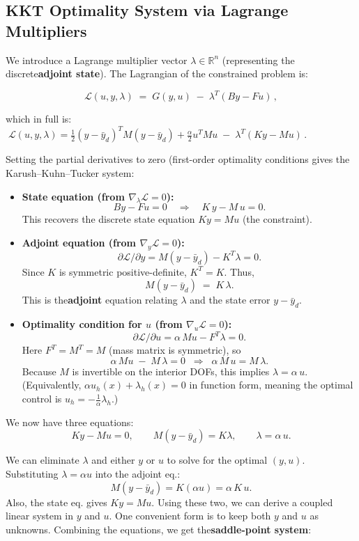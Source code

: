 \documentclass[a4paper,10pt]{report}
\begin{document}
\subsection{KKT Optimality System via Lagrange Multipliers}

We introduce a Lagrange multiplier vector \(\lambda\in\mathbb{R}^n\) (representing the discrete\textbf{adjoint state}). The Lagrangian of the constrained problem is:

\[
	\mathcal{L}(u,y,\lambda) \;=\; G(y,u)\;-\;\lambda^T(B y - F u)\,,
\]

which in full is: \(\; \mathcal{L}(u,y,\lambda) = \frac{1}{2}(y-\bar y_d)^T M (y-\bar y_d) + \frac{\alpha}{2} u^T M u \;-\;\lambda^T(Ky - M u)\,. \)

Setting the partial derivatives to zero (first-order optimality conditions gives the Karush–Kuhn–Tucker system:

\begin{itemize}
	\item \textbf{State equation (from \(\nabla_\lambda \mathcal{L}=0\)):}
	      \[By - Fu = 0 \quad\Longrightarrow\quad K\,y - M\,u = 0.\]
	      This recovers the discrete state equation \(K y = M u\) (the constraint).
	\item \textbf{Adjoint equation (from \(\nabla_y \mathcal{L}=0\)):}
	      \[\partial \mathcal{L}/\partial y = M(y - \bar y_d) - K^T \lambda = 0.\]
	      Since \(K\) is symmetric positive-definite, \(K^T=K\). Thus,
	      \[M(y - \bar y_d) \;=\; K\,\lambda.\]
	      This is the\textbf{adjoint} equation relating \(\lambda\) and the state error \(y-\bar y_d\).

	\item \textbf{Optimality condition for \(u\) (from \(\nabla_u \mathcal{L}=0\)):}
	      \[\partial \mathcal{L}/\partial u = \alpha\, M u - F^T \lambda = 0.\]
	      Here \(F^T=M^T=M\) (mass matrix is symmetric), so
	      \[\alpha\, M u \;-\; M\,\lambda = 0 \;\;\Longrightarrow\;\; \alpha\,M\,u = M\,\lambda.\]
	      Because \(M\) is invertible on the interior DOFs, this implies \(\lambda = \alpha\,u\).  (Equivalently, \(\alpha u_h(x) + \lambda_h(x) = 0\) in function form, meaning the optimal control is \(u_h=-\frac{1}{\alpha}\lambda_h\).)
\end{itemize}

We now have three equations:
\[
	K y - M u = 0, \qquad M(y - \bar y_d) = K\lambda, \qquad \lambda = \alpha\,u.
\]

We can eliminate \(\lambda\) and either \(y\) or \(u\) to solve for the optimal \((y,u)\). Substituting \(\lambda=\alpha u\) into the adjoint eq.:
\[M(y - \bar y_d) = K(\alpha u) = \alpha\,K\,u.\]
Also, the state eq. gives \(K y = M u\). Using these two, we can derive a coupled linear system in \(y\) and \(u\). One convenient form is to keep both \(y\) and \(u\) as unknowns. Combining the equations, we get the\textbf{saddle-point system}:
\end{document}

